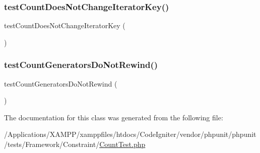 \mbox{\label{class_count_test_a556186f47c69eb5676b57c1c206ad84f}} 
\subsubsection{\texorpdfstring{test\+Count\+Does\+Not\+Change\+Iterator\+Key()}{testCountDoesNotChangeIteratorKey()}}
{\footnotesize\ttfamily test\+Count\+Does\+Not\+Change\+Iterator\+Key (\begin{DoxyParamCaption}{ }\end{DoxyParamCaption})}

\mbox{\label{class_count_test_ab115202819121ca5c72f9c87955f2c9f}} 
\subsubsection{\texorpdfstring{test\+Count\+Generators\+Do\+Not\+Rewind()}{testCountGeneratorsDoNotRewind()}}
{\footnotesize\ttfamily test\+Count\+Generators\+Do\+Not\+Rewind (\begin{DoxyParamCaption}{ }\end{DoxyParamCaption})}



The documentation for this class was generated from the following file\+:\begin{DoxyCompactItemize}
\item 
/\+Applications/\+X\+A\+M\+P\+P/xamppfiles/htdocs/\+Code\+Igniter/vendor/phpunit/phpunit/tests/\+Framework/\+Constraint/\mbox{\hyperlink{_count_test_8php}{Count\+Test.\+php}}\end{DoxyCompactItemize}
